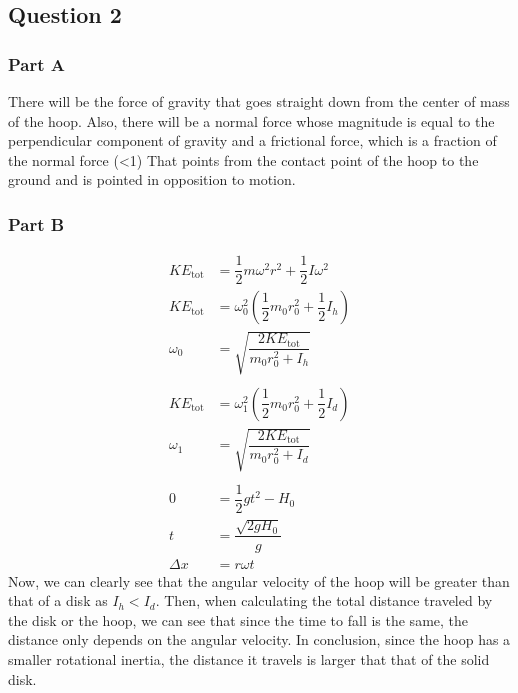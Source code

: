 \documentclass[]{scrartcl}
\begin{document}
\subsection*{Question 2}
\subsubsection*{Part A}
  There will be the force of gravity that goes straight down from the center of mass of the hoop. Also, there will be a normal force whose magnitude is equal to the perpendicular component of gravity and a frictional force, which is a fraction of the normal force (<1) That points from the contact point of the hoop to the ground and is pointed in opposition to motion.
\subsubsection*{Part B}
  \begin{align*}
    KE_{\textrm{tot}} &= \dfrac12 m\omega^2r^2 + \dfrac12 I\omega^2 \tag{equation} \\
    KE_{\textrm{tot}} &= \omega_0^2\left(\dfrac12 m_0 r_0^2 + \dfrac12 I_h\right) \tag{hoop} \\
    \omega_0 &= \sqrt{\dfrac{2KE_{\textrm{tot}}}{m_0 r_0^2 + I_h}} \\ \\
    KE_{\textrm{tot}} &= \omega_1^2\left(\dfrac12 m_0 r_0^2 + \dfrac12 I_d\right) \tag{solid disk} \\
    \omega_1 &= \sqrt{\dfrac{2KE_{\textrm{tot}}}{m_0 r_0^2 + I_d}} \\ \\
    0 &= \dfrac12 gt^2 - H_0 \tag{finding time} \\
    t &= \dfrac{\sqrt{2gH_0}}{g} \\
    \Delta x &= r\omega t \tag{dependent on $\omega$}
  \end{align*}
  Now, we can clearly see that the angular velocity of the hoop will be greater than that of a disk as $I_h < I_d$. Then, when calculating the total distance traveled by the disk or the hoop, we can see that since the time to fall is the same, the distance only depends on the angular velocity. In conclusion, since the hoop has a smaller rotational inertia, the distance it travels is larger that that of the solid disk.
\end{document}
